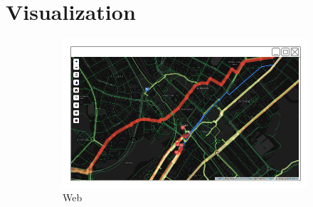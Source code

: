 

\section{Visualization}

\begin{figure}[ht]
  \centering
  \begin{subfigure}[b]{0.6\textwidth}
    \includegraphics[width=\textwidth]
      {img/c03-merge/png/web-basemap-merge.png}
    \caption{Web}
  \end{subfigure}
  ~
  \begin{subfigure}[b]{0.2\textwidth}

\end{subfigure}
\end{figure}
